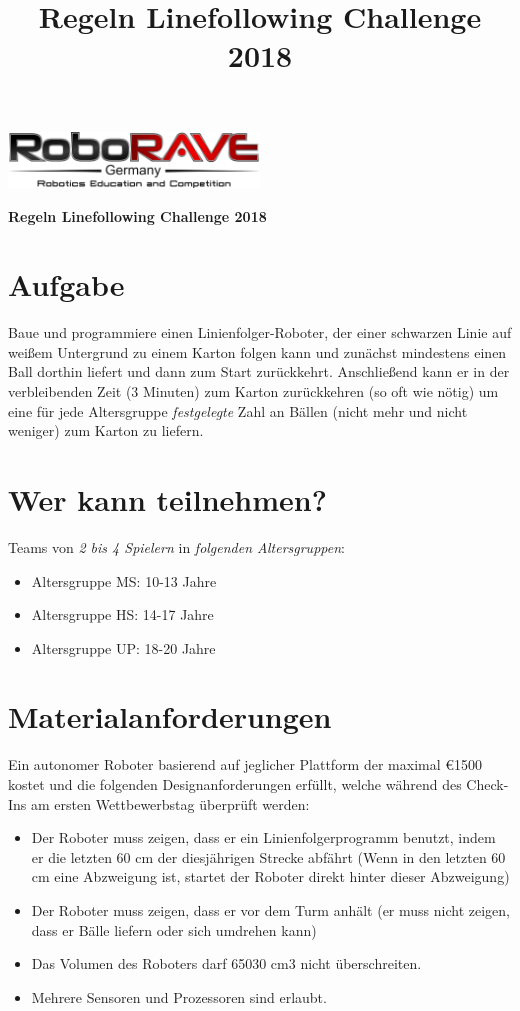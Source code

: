\documentclass[a4paper,12pt]{article}
\begin{document}
\title{Regeln Linefollowing Challenge 2018}

 \begin{center}
\includegraphics[width=0.5\textwidth]{logo.png}

\huge                      %
\bfseries                   %
Regeln Linefollowing Challenge 2018
  \end{center}
\section{Aufgabe}
Baue und programmiere einen Linienfolger-Roboter, der einer schwarzen Linie auf weißem Untergrund zu
einem Karton folgen kann und zunächst mindestens einen Ball dorthin liefert und dann zum Start zurückkehrt.
Anschließend kann er in der verbleibenden Zeit (3 Minuten) zum Karton zurückkehren (so oft wie nötig) um
eine für jede Altersgruppe \emph{festgelegte} Zahl an Bällen (nicht mehr und nicht weniger) zum Karton zu liefern.
\section{Wer kann teilnehmen?}
Teams von \emph{2 bis 4 Spielern} in \emph{folgenden Altersgruppen}:
\begin{itemize}
		\item Altersgruppe MS: 10-13 Jahre
		\item Altersgruppe HS: 14-17 Jahre
		\item Altersgruppe UP: 18-20 Jahre
\end{itemize}
\section{Materialanforderungen}
Ein autonomer Roboter basierend auf jeglicher Plattform der maximal \euro{1500} kostet und die folgenden
Designanforderungen erfüllt, welche während des Check-Ins am ersten Wettbewerbstag überprüft werden:

\begin{itemize}
	\item Der Roboter muss zeigen, dass er ein Linienfolgerprogramm benutzt, indem er die letzten 60 cm der
	diesjährigen Strecke abfährt (Wenn in den letzten 60 cm eine Abzweigung ist, startet der Roboter direkt hinter
	dieser Abzweigung)
	\item Der Roboter muss zeigen, dass er vor dem Turm anhält (er muss nicht zeigen, dass er Bälle liefern oder sich
	umdrehen kann)
	\item Das Volumen des Roboters darf 65030 cm3 nicht überschreiten.
	\item Mehrere Sensoren und Prozessoren sind erlaubt.
\end{itemize}
\end{document}
